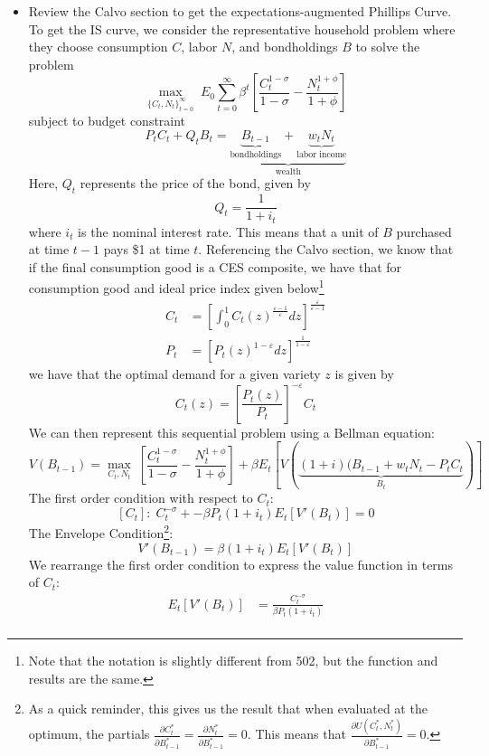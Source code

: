 \documentclass[12pt]{article}
\begin{document}
\begin{itemize}
    \item Review the Calvo section to get the expectations-augmented Phillips Curve. To get the IS curve, we consider the representative household problem where they choose consumption $C$, labor $N$, and bondholdings $B$ to solve the problem
    \[\max_{\{C_t,N_t\}_{t=0}^{\infty}}\; E_0\sum_{t=0}^{\infty} \beta^t\left[\frac{C_t^{1-\sigma}}{1-\sigma} - \frac{N_t^{1+\phi}}{1+\phi}\right]\]
    subject to budget constraint
    \[P_tC_t + Q_tB_t = \underbrace{\underbrace{B_{t-1}}_{\text{bondholdings}} + \underbrace{w_tN_t}_{\text{labor income}}}_{\text{wealth}}\]
    Here, $Q_t$ represents the price of the bond, given by
    \[Q_t = \frac{1}{1+i_t}\]
    where $i_t$ is the nominal interest rate. This means that a unit of $B$ purchased at time $t-1$ pays \$1 at time $t$. Referencing the Calvo section, we know that if the final consumption good is a CES composite, we have that for consumption good and ideal price index given below\footnote{Note that the notation is slightly different from 502, but the function and results are the same.}
    \[\begin{split}
        C_t &= \left[\int_0^1C_t(z)^{\frac{\varepsilon-1}{\varepsilon}}dz\right]^{\frac{\varepsilon}{\varepsilon-1}} \\
        P_t &= \left[P_t(z)^{1-\varepsilon}dz\right]^{\frac{1}{1-\varepsilon}}
    \end{split}\]
    we have that the optimal demand for a given variety $z$ is given by
    \[C_t(z) = \left[\frac{P_t(z)}{P_t}\right]^{-\varepsilon}C_t\]
    We can then represent this sequential problem using a Bellman equation:
    \[V(B_{t-1}) = \max_{C_t,N_t}\;\left[\frac{C_t^{1-\sigma}}{1-\sigma} - \frac{N_t^{1+\phi}}{1+\phi}\right] + \beta E_t[V(\underbrace{(1+i)(B_{t-1} + w_tN_t - P_tC_t}_{B_t})]\]
    The first order condition with respect to $C_t$:
    \[[C_t]:\; C_t^{-\sigma} + -\beta P_t(1+i_t)E_t[V'(B_t)] = 0\]
    The Envelope Condition\footnote{As a quick reminder, this gives us the result that when evaluated at the optimum, the partials $\frac{\partial C_t^*}{\partial B_{t-1}^*} = \frac{\partial N_t^*}{\partial B_{t-1}^*} = 0$. This means that $\frac{\partial U(C_t^*,N_t^*)}{\partial B_{t-1}^*} = 0$.}:
    \[V'(B_{t-1}) = \beta (1+i_t)E_t[V'(B_t)]\]
    We rearrange the first order condition to express the value function in terms of $C_t$:
    \[\begin{split}
        E_t[V'(B_t)] &= \frac{C_t^{-\sigma}}{\beta P_t(1+i_t)} \\

\end{split}\]
\end{itemize}
\end{document}
